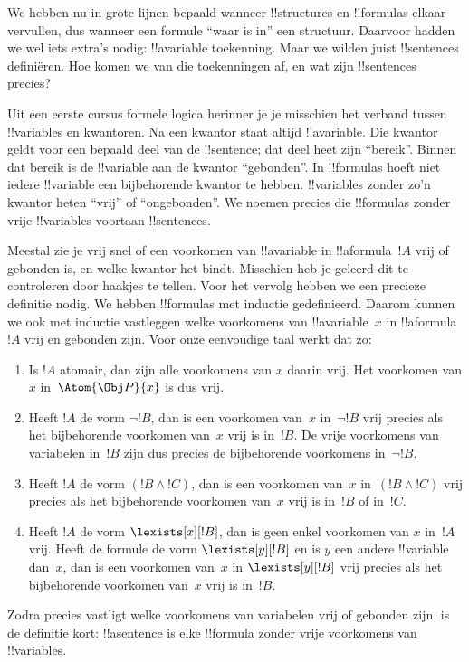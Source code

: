 \documentclass[../../../include/open-logic-section]{subfiles}
\begin{document}


We hebben nu in grote lijnen bepaald wanneer !!{structure}s en
!!{formula}s elkaar vervullen, dus wanneer een formule ``waar is in''
een structuur. Daarvoor hadden we wel iets extra's nodig: !!a{variable}
toekenning. Maar we wilden juist !!{sentence}s definiëren. Hoe komen we
van die toekenningen af, en wat zijn !!{sentence}s precies?

Uit een eerste cursus formele logica herinner je je misschien het
verband tussen !!{variable}s en kwantoren. Na een kwantor staat altijd
!!a{variable}. Die kwantor geldt voor een bepaald deel van de
!!{sentence}; dat deel heet zijn ``bereik''. Binnen dat bereik is de
!!{variable} aan de kwantor ``gebonden''. In !!{formula}s hoeft niet
iedere !!{variable} een bijbehorende kwantor te hebben. !!{variable}s
zonder zo'n kwantor heten ``vrij'' of ``ongebonden''. We noemen precies
die !!{formula}s zonder vrije !!{variable}s voortaan !!{sentence}s.

Meestal zie je vrij snel of een voorkomen van !!a{variable} in
!!a{formula}~$!A$ vrij of gebonden is, en welke kwantor het bindt.
Misschien heb je geleerd dit te controleren door haakjes te tellen.
Voor het vervolg hebben we een precieze definitie nodig. We hebben
!!{formula}s met inductie gedefinieerd. Daarom kunnen we ook met
inductie vastleggen welke voorkomens van !!a{variable}~$x$ in
!!a{formula}~$!A$ vrij en gebonden zijn. Voor onze eenvoudige taal
werkt dat zo:
\begin{enumerate}
  \item Is $!A$ atomair, dan zijn alle voorkomens van $x$ daarin vrij.
  Het voorkomen van $x$ in~$\Atom{\Obj P}{x}$ is dus vrij.
  \item Heeft $!A$ de vorm $\lnot !B$, dan is een voorkomen van~$x$
  in~$\lnot !B$ vrij precies als het bijbehorende voorkomen van~$x$
  vrij is in~$!B$. De vrije voorkomens van variabelen in~$!B$ zijn dus
  precies de bijbehorende voorkomens in~$\lnot !B$.
  \item Heeft $!A$ de vorm $(!B \land !C)$, dan is een voorkomen van~$x$
  in~$(!B \land !C)$ vrij precies als het bijbehorende voorkomen van~$x$
  vrij is in~$!B$ of in~$!C$.
  \item Heeft $!A$ de vorm $\lexists[x][!B]$, dan is geen enkel voorkomen
  van $x$ in~$!A$ vrij. Heeft de formule de vorm $\lexists[y][!B]$ en is $y$
  een andere !!{variable} dan~$x$, dan is een voorkomen van~$x$ in
  $\lexists[y][!B]$ vrij precies als het bijbehorende voorkomen van~$x$
  vrij is in~$!B$.
\end{enumerate}

Zodra precies vastligt welke voorkomens van variabelen vrij of
gebonden zijn, is de definitie kort: !!a{sentence} is elke !!{formula}
zonder vrije voorkomens van !!{variable}s.
\end{document}

